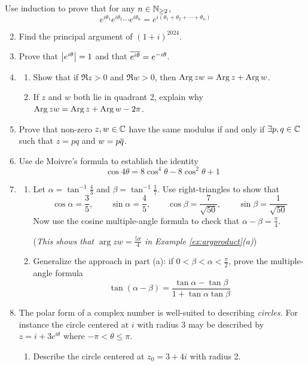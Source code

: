 \begin{exercises}
	\exstart Use induction to prove that for any $n\in\mathbb{N}_{\ge 2}$,
	\[
		e^{i\theta_1}e^{i\theta_2}\cdots e^{i\theta_n}=e^{i(\theta_1+\theta_2+\cdots+\theta_n)}
	\]

	\begin{enumerate}\setcounter{enumi}{1}
		\item Find the principal argument of $(1+i)^{2024}$.
		
		\item Prove that $\left| e^{i\theta}\right|=1$ and that $\overline{e^{i\theta}}=e^{-i\theta}$.
	
		\item\begin{enumerate}
		  \item Show that if $\Re z>0$ and $\Re w>0$, then $\operatorname{Arg} zw=\operatorname{Arg} z+\operatorname{Arg} w$.
			\item If $z$ and $w$ both lie in quadrant 2, explain why $\operatorname{Arg} zw=\operatorname{Arg} z+\operatorname{Arg} w-2\pi$.
		\end{enumerate}
	
	 	\item Prove that non-zero $z,w\in\mathbb{C}$ have the same modulus if and only if $\exists p,q\in\mathbb{C}$ such that $z=pq$ and $w=p\overline{q}$.
		
	  \item\label{ex:deM} Use de Moivre's formula to establish the identity
	  \[
	  	\cos 4\theta=8\cos^4\!\theta-8\cos^2\!\theta+1
	  \]
	  
	  \item\label{ex:argproduct2}
	  \begin{enumerate}
	    \item Let $\alpha=\tan^{-1}\frac 43$ and $\beta=\tan^{-1}\frac 17$. Use right-triangles to show that
	  	\[
	  		\cos\alpha=\frac 35,\qquad\sin\alpha=\frac 45,\qquad\cos\beta=\frac 7{\sqrt{50}},\qquad\sin\beta=\frac 1{\sqrt{50}}
	  	\]
	  	Now use the cosine multiple-angle formula to check that $\alpha-\beta=\frac\pi 4$.\par
	  	(\emph{This shows that $\arg zw=\frac{5\pi}4$ in Example \ref{ex:argproduct}(a)})
	  	
	  	\item Generalize the approach in part (a): if $0<\beta<\alpha<\frac\pi 2$, prove the multiple-angle formula
	  	\[
	  		\tan(\alpha-\beta)=\frac{\tan\alpha-\tan\beta}{1+\tan\alpha\tan\beta}
	  	\]
	  \end{enumerate}
	  
	 
	  \item The polar form of a complex number is well-suited to describing \emph{circles.} For instance the circle centered at $i$ with radius 3 may be described by $z=i+3e^{i\theta}$ where $-\pi<\theta\le\pi$. 
	  \begin{enumerate}
	    \item Describe the circle centered at $z_0=3+4i$ with radius 2.
	    

\end{enumerate}
\end{enumerate}
\end{exercises}
